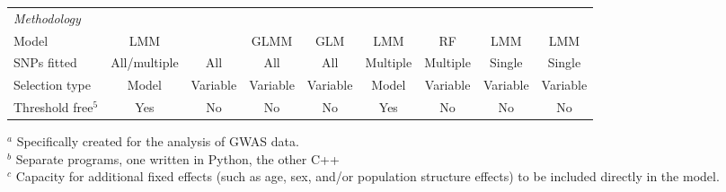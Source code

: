 \documentclass{article}
\begin{document}
\begin{landscape}
\begin{table}
\begin{tabular}{lcccccccc}
{\em Methodology}    &         &            &             &                   &            &                &      &      \\  
\hspace{1mm}  Model                     & LMM   &   &  GLMM &   GLM  & LMM  & RF & LMM   & LMM \\ [0.15cm]

\hspace{1mm} SNPs fitted       &    All/multiple      &    All       &   All        &      All          &  Multiple          &  Multiple              &   Single   &  Single   \\  [0.35cm]


\hspace{1mm}  Selection type              & Model   & Variable  &  Variable &  Variable  &  Model  &  Variable & Variable  & Variable \\  [0.35cm]

\hspace{1mm} Threshold free$^5$        &    Yes     &  No    &  No         &    No               &     Yes       &  No              &  No   & No      \\  [0.15cm]  \hline
           

\end{tabular}
{$^a$ \scriptsize{Specifically created for the analysis of GWAS data.}}\\
{$^b$ \scriptsize{Separate programs, one written in Python, the other C++}} \\
{$^c$ \scriptsize{Capacity for additional fixed effects (such as  age, sex, and/or population structure effects) to be included directly in the model.}} \\
\end{table}


\end{landscape}
\end{document}
